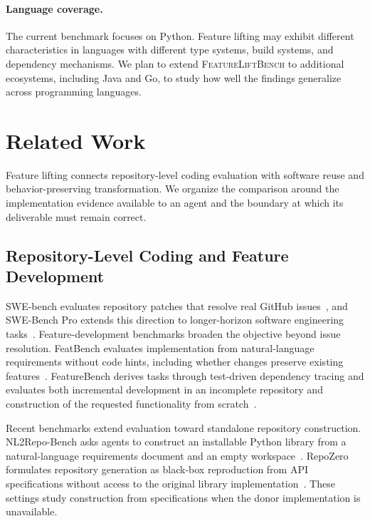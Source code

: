 \documentclass[acmsmall,screen,review,anonymous]{acmart}
\newcommand{\flb}{\textsc{FeatureLiftBench}\xspace}
\begin{document}
\paragraph{Language coverage.}
The current benchmark focuses on Python. Feature lifting may exhibit different
characteristics in languages with different type systems, build systems, and
dependency mechanisms. We plan to extend \flb to additional ecosystems,
including Java and Go, to study how well the findings generalize across
programming languages.

\section{Related Work}
\label{sec:related-work}

Feature lifting connects repository-level coding evaluation with software reuse
and behavior-preserving transformation. We organize the comparison around the
implementation evidence available to an agent and the boundary at which its
deliverable must remain correct.

\subsection{Repository-Level Coding and Feature Development}

SWE-bench evaluates repository patches that resolve real GitHub
issues~\cite{jimenez2024swebench}, and SWE-Bench Pro extends this direction to
longer-horizon software engineering tasks~\cite{deng2025swebenchpro}.
Feature-development benchmarks broaden the objective beyond issue resolution.
FeatBench evaluates implementation from natural-language requirements without
code hints, including whether changes preserve existing
features~\cite{chen2026featbench}. FeatureBench derives tasks through test-driven
dependency tracing and evaluates both incremental development in an incomplete
repository and construction of the requested functionality from
scratch~\cite{zhou2026featurebench}.

Recent benchmarks extend evaluation toward standalone repository construction.
NL2Repo-Bench asks agents to construct an installable Python library from a
natural-language requirements document and an empty
workspace~\cite{ding2026nl2repo}. RepoZero formulates repository generation as
black-box reproduction from API specifications without access to the original
library implementation~\cite{zhang2026repozero}. These settings study construction
from specifications when the donor implementation is unavailable.
\end{document}
